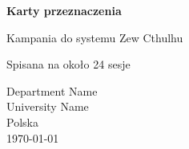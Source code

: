 \begin{titlepage}
   \begin{center}
       \vspace*{1cm}

       \textbf{Karty przeznaczenia}

       \vspace{0.5cm}
       Kampania do systemu Zew Cthulhu

       \vspace{0.5cm}
       \vfill

       Spisana na około 24 sesje

       \vspace{0.8cm}


       Department Name\\
       University Name\\
       Polska\\
       \today

   \end{center}
\end{titlepage}
